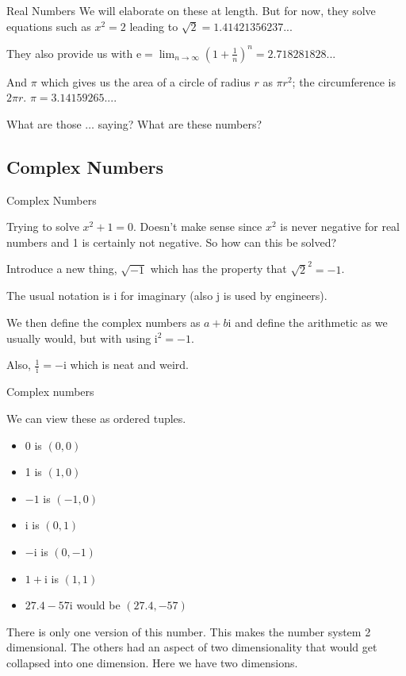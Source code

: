 \documentclass{beamer}
\begin{document}
\begin{frame}{Real Numbers}
    We will elaborate on these at length. But for now, they solve equations such as $x^2 = 2$ leading to $\sqrt{2} = 1.41421356237...$

    They also provide us with $\mathrm{e} = \lim_{n \to \infty} (1+\frac{1}{n})^n  = 2.718281828...$

    And $\pi$ which gives us the area of a circle of radius $r$ as $\pi r^2$; the circumference is $2 \pi r$. $\pi = 3.14159265....$

    What are those $\ldots$ saying?  What are these numbers?  
    
\end{frame}

\subsection{Complex Numbers}

\begin{frame}{Complex Numbers}

Trying to solve $x^2 + 1 = 0$. Doesn't make sense since $x^2$ is never negative for real numbers and 1 is certainly not negative. So how can this be solved? 

Introduce a new thing, $\sqrt{-1}$ which has the property that $\sqrt{2}^2 = -1$. 

The usual notation is $\mathrm{i}$ for imaginary (also $\mathrm{j}$ is used by engineers).

We then define the complex numbers as $a + b \mathrm{i}$ and define the arithmetic as we usually would, but with using $\mathrm{i}^2 = -1$. 

Also, $\frac{1}{\mathrm{i}} = - \mathrm{i}$ which is neat and weird. 

\end{frame}

\begin{frame}{Complex numbers}

We can view these as ordered tuples. 

\begin{itemize}
    \item 0 is  $(0,0)$
    \item 1 is  $(1,0)$
    \item $-1$ is $(-1,0)$
    \item $\mathrm{i}$ is $(0,1)$
    \item $-\mathrm{i}$ is $(0, -1)$
    \item $1+\mathrm{i}$ is $(1,1)$
    \item $27.4 -57 \mathrm{i}$ would be $(27.4, -57)$
\end{itemize}

There is only one version of this number. This makes the number system 2 dimensional. The others had an aspect of two dimensionality that would get collapsed into one dimension. Here we have two dimensions. 


\end{frame}
\end{document}
